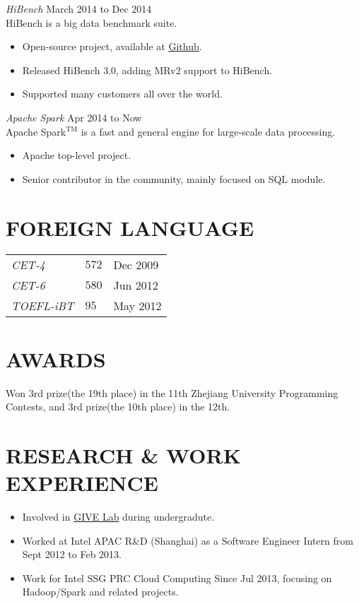 \documentclass[line,margin]{res}
\begin{document}
\begin{resume}
                {\sl HiBench} \hfill        March 2014 to Dec 2014\\
                HiBench is a big data benchmark suite.
                  \begin{itemize}
                   \item Open-source project, available at \href{https://github.com/intel-hadoop/HiBench}{Github}.
                   \item Released HiBench 3.0, adding MRv2 support to HiBench.
                   \item Supported many customers all over the world.
                   \end{itemize}

                {\sl Apache Spark} \hfill        Apr 2014 to Now\\
                Apache Spark$^{\textrm{TM}}$ is a fast and general engine for large-scale data processing.
                  \begin{itemize}
                   \item Apache top-level project.
                   \item Senior contributor in the community, mainly focused on SQL module.
                   \end{itemize}

\section{FOREIGN LANGUAGE}
\begin{tabular}{p{}p{}p{}}
{\sl CET-4} &{$572$} &\hfill Dec 2009\\
{\sl CET-6} &{$580$} &\hfill Jun 2012\\
{\sl TOEFL-iBT} &{$95$} &\hfill May 2012
\end{tabular}
\section{AWARDS}
            Won 3rd prize(the 19th place) in the 11th Zhejiang University Programming Contests, and 3rd prize(the 10th place) in the 12th.

\section{RESEARCH \& WORK\\ EXPERIENCE}
            \begin{itemize}
            \item Involved in \href{http://give.zju.edu.cn/en/portal/index.html}{GIVE Lab} during undergradute.
            \item Worked at Intel APAC R\&D (Shanghai) as a Software Engineer Intern from Sept 2012 to Feb 2013.
            \item Work for Intel SSG PRC Cloud Computing Since Jul 2013, focusing on Hadoop/Spark and related projects.
            \end{itemize}


\end{resume}
\end{document}
